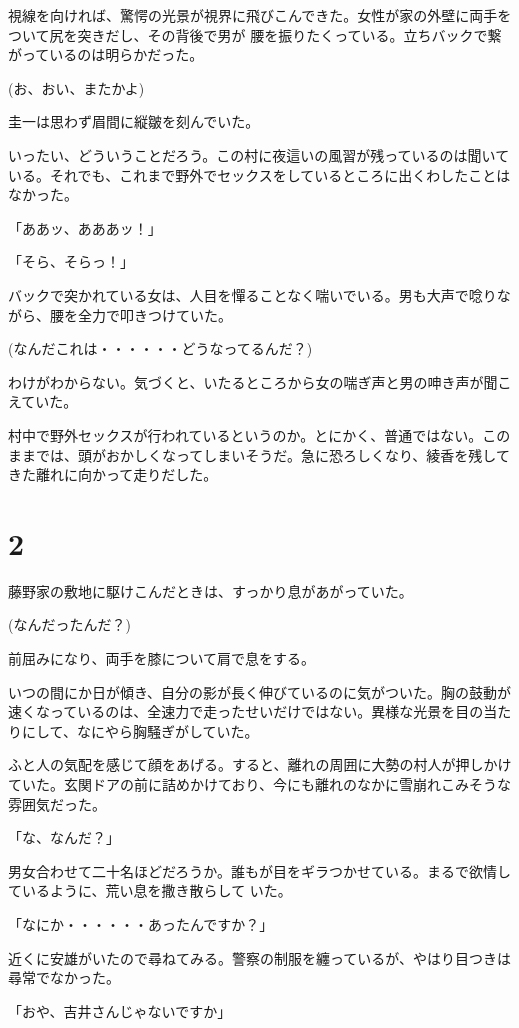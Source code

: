 ﻿\documentclass[book,tate]{jlreq}
\begin{document}
視線を向ければ、驚愕の光景が視界に飛びこんできた。女性が家の外壁に両手をついて尻を突きだし、その背後で男が 腰を振りたくっている。立ちバックで繋がっているのは明らかだった。

(お、おい、またかよ)

圭一は思わず眉間に縦皺を刻んでいた。

いったい、どういうことだろう。この村に夜這いの風習が残っているのは聞いている。それでも、これまで野外でセックスをしているところに出くわしたことはなかった。

「ああッ、あああッ！」

「そら、そらっ！」

バックで突かれている女は、人目を憚ることなく喘いでいる。男も大声で唸りながら、腰を全力で叩きつけていた。

(なんだこれは・・・・・・どうなってるんだ？)

わけがわからない。気づくと、いたるところから女の喘ぎ声と男の呻き声が聞こえていた。

村中で野外セックスが行われているというのか。とにかく、普通ではない。このままでは、頭がおかしくなってしまいそうだ。急に恐ろしくなり、綾香を残してきた離れに向かって走りだした。

\section*{2}

藤野家の敷地に駆けこんだときは、すっかり息があがっていた。

(なんだったんだ？)

前屈みになり、両手を膝について肩で息をする。

いつの間にか日が傾き、自分の影が長く伸びているのに気がついた。胸の鼓動が速くなっているのは、全速力で走ったせいだけではない。異様な光景を目の当たりにして、なにやら胸騒ぎがしていた。

ふと人の気配を感じて顔をあげる。すると、離れの周囲に大勢の村人が押しかけていた。玄関ドアの前に詰めかけており、今にも離れのなかに雪崩れこみそうな雰囲気だった。

「な、なんだ？」

男女合わせて二十名ほどだろうか。誰もが目をギラつかせている。まるで欲情しているように、荒い息を撒き散らして いた。

「なにか・・・・・・あったんですか？」

近くに安雄がいたので尋ねてみる。警察の制服を纏っているが、やはり目つきは尋常でなかった。

「おや、吉井さんじゃないですか」
\end{document}
